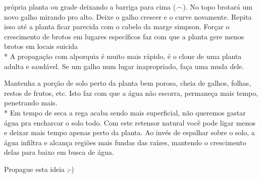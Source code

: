 própria planta ou grade deixando a barriga para cima ($\frown$). No topo 
brotará um novo galho mirando pro alto. Deixe o galho crescer e o curve 
novamente. Repita isso até a planta ficar parecida com o cabelo da marge 
simpson. Forçar o crescimento de brotos em lugares específicos faz com 
que a planta gere menos brotos em locais suicida\\*
A propagação com alporquia é muito mais rápido, é o clone de uma planta 
adulta e saudável. Se um galho num lugar inapropriado, faça uma muda 
dele.\\
\par
\indent Mantenha a porção de solo perto da planta bem porosa, cheia de 
galhos, folhas, restos de frutos, etc. Isto faz com que a água não 
escorra, permaneça mais tempo, penetrando mais.\\*
Em tempo de seca a rega acaba sendo mais superficial, não queremos 
gastar água pra encharcar o solo todo. Com este retensor natural você pode 
ligar menos e deixar mais tempo apenas perto da planta. Ao invés de 
espalhar sobre o solo, a água infiltra e alcança regiões mais fundas das 
raízes, mantendo o crescimento delas para baixo em busca de água.\\
\hfill
\begin{flushright}Propague esta ideia ;-)\end{flushright}


%
%
%
